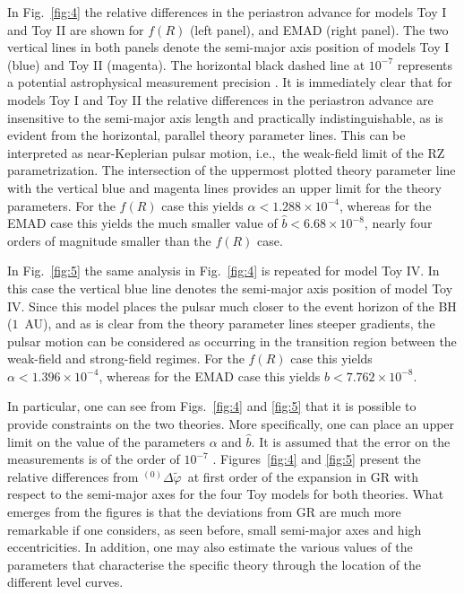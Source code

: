 \documentclass[a4paper,aps,twocolumn,showpacs,showkeys,nofootinbib,preprintnumbers,superscriptaddress,amsmath,amssymb,amsfonts]{revtex4-1}
\newcommand{\ie}{{i.e.,}~}
\begin{document}
In Fig.~\ref{fig:4} the relative differences in the periastron advance for models
Toy I and Toy II are shown for $f(R)$ (left panel), and EMAD (right panel).
The two vertical lines in both panels denote the semi-major axis position of
models Toy I (blue) and Toy II (magenta). 
The horizontal black dashed line at $10^{-7}$ represents a potential
astrophysical measurement precision \cite{Liu2012}.
It is immediately clear that for models Toy I and Toy II
the relative differences in the periastron advance
are insensitive to the semi-major axis length and practically indistinguishable,
as is evident from the horizontal, parallel theory parameter lines.
This can be interpreted as near-Keplerian pulsar motion, \ie the weak-field
limit of the RZ parametrization.
The intersection of the uppermost plotted theory parameter line with the vertical blue
and magenta lines provides an upper limit for the theory parameters.
For the $f(R)$ case this yields $\alpha < 1.288\times 10^{-4}$, whereas for the EMAD
case this yields the much smaller value of $\hat{b} < 6.68\times 10^{-8}$, nearly four
orders of magnitude smaller than the $f(R)$ case.

In Fig.~\ref{fig:5} the same analysis in Fig.~\ref{fig:4} is repeated for model Toy IV.
In this case the vertical blue line denotes the semi-major axis position of model Toy IV.
Since this model places the pulsar much closer to the event horizon of the BH ($1$~AU),
and as is clear from the theory parameter lines steeper gradients, the pulsar motion
can be considered as occurring in the transition region between the weak-field
and strong-field regimes.
For the $f(R)$ case this yields $\alpha < 1.396\times 10^{-4}$, whereas for the EMAD
case this yields $\hat{b} < 7.762\times 10^{-8}$.

In particular, one can see from Figs.~\ref{fig:4} and \ref{fig:5} that it is possible
to provide constraints on the two theories. More specifically, one can
place an upper limit on the value of the parameters $\alpha$ and $\hat{b}$.
It is assumed that the error on the measurements is of the order of $10^{-7}$
\cite{Liu2012}. Figures~\ref{fig:4} and \ref{fig:5} present the relative
differences from ${}^{(0)}\Delta\widetilde{\varphi}\,$ at first order of the
expansion in GR with respect to the semi-major axes for the four Toy
models for both theories. What emerges from the figures is that the
deviations from GR are much more remarkable if one considers, as seen
before, small semi-major axes and high eccentricities. In addition, one
may also estimate the various values of the parameters that characterise
the specific theory through the location of the different level curves.
\end{document}
